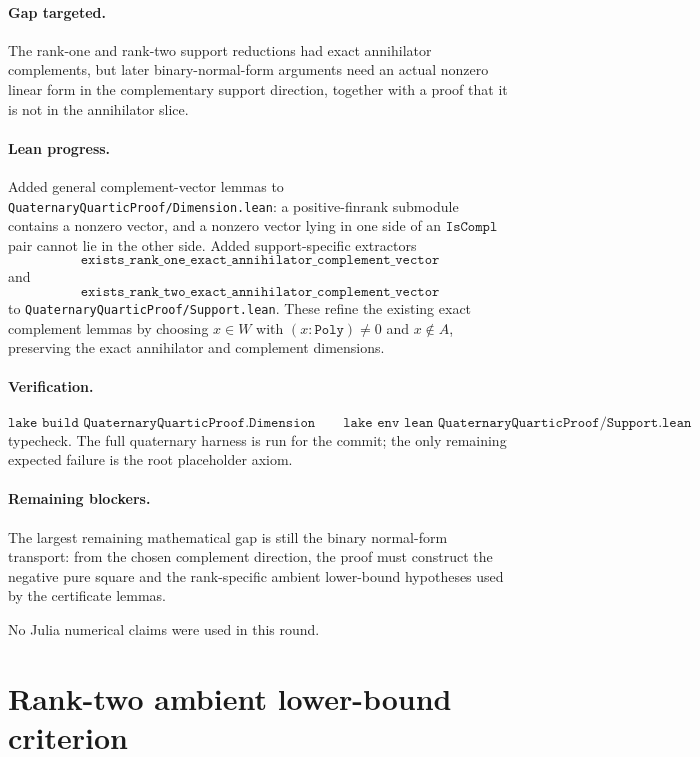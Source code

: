 \documentclass[11pt]{article}
\begin{document}
\paragraph{Gap targeted.}
The rank-one and rank-two support reductions had exact annihilator complements,
but later binary-normal-form arguments need an actual nonzero linear form in
the complementary support direction, together with a proof that it is not in
the annihilator slice.

\paragraph{Lean progress.}
Added general complement-vector lemmas to
\texttt{QuaternaryQuarticProof/Dimension.lean}: a positive-finrank submodule
contains a nonzero vector, and a nonzero vector lying in one side of an
\(\texttt{IsCompl}\) pair cannot lie in the other side.  Added support-specific
extractors
\[
\texttt{exists\_rank\_one\_exact\_annihilator\_complement\_vector}
\]
and
\[
\texttt{exists\_rank\_two\_exact\_annihilator\_complement\_vector}
\]
to \texttt{QuaternaryQuarticProof/Support.lean}.  These refine the existing
exact complement lemmas by choosing \(x \in W\) with \((x:\texttt{Poly})\ne0\)
and \(x\notin A\), preserving the exact annihilator and complement dimensions.

\paragraph{Verification.}
\[
\texttt{lake build QuaternaryQuarticProof.Dimension}
\qquad
\texttt{lake env lean QuaternaryQuarticProof/Support.lean}
\]
typecheck.  The full quaternary harness is run for the commit; the only
remaining expected failure is the root placeholder axiom.

\paragraph{Remaining blockers.}
The largest remaining mathematical gap is still the binary normal-form
transport: from the chosen complement direction, the proof must construct the
negative pure square and the rank-specific ambient lower-bound hypotheses used
by the certificate lemmas.

No Julia numerical claims were used in this round.

\section*{Rank-two ambient lower-bound criterion}
\end{document}
